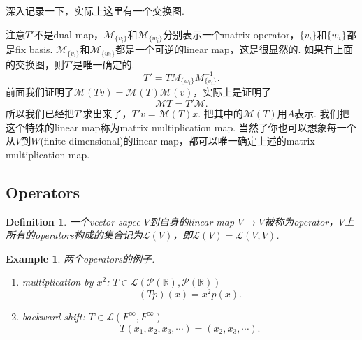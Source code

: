 \documentclass{article}
\newtheorem{example}[theorem]{Example}
\newtheorem{definition}[theorem]{Definition}
\begin{document}
深入记录一下，实际上这里有一个交换图.
\begin{center}
\end{center}
注意$T'$不是dual map，$\mathcal{M}_{\{v_i\}}$和$\mathcal{M}_{\{w_i\}}$分别表示一个matrix operator，$\{v_i\}$和$\{w_i\}$都是fix basis. $\mathcal{M}_{\{v_i\}}$和$\mathcal{M}_{\{w_i\}}$都是一个可逆的linear map，这是很显然的. 如果有上面的交换图，则$T'$是唯一确定的.
$$
T' = TM_{\{w_i\}}M^{-1}_{\{v_i\}}.
$$
前面我们证明了$\mathcal{M}(Tv) = \mathcal{M}(T)\mathcal{M}(v)$，实际上是证明了
$$
\mathcal{M}T = T'\mathcal{M}.
$$
所以我们已经把$T'$求出来了，$T'v= \mathcal{M}(T)x$. 把其中的$\mathcal{M}(T)$用$A$表示. 我们把这个特殊的linear map称为matrix multiplication map. 当然了你也可以想象每一个从$V$到$W$(finite-dimensional)的linear map，都可以唯一确定上述的matrix multiplication map.

\newpage
\subsection{Operators}

\begin{definition}
\rm 一个vector sapce $V$到自身的linear map $V \rightarrow V$被称为operator，$V$上所有的operators构成的集合记为$\mathcal{L}(V)$，即$\mathcal{L}(V)=\mathcal{L}(V,V)$.
\end{definition}

\begin{example}
两个operators的例子.
\begin{enumerate}
	\item multiplication by $x^2$: $T \in \mathcal{L}(\mathcal{P}(\mathbb{R}),\mathcal{P}(\mathbb{R}))$
	$$
		(Tp)(x) = x^2p(x).
	$$
	\item backward shift: $T \in \mathcal{L}(F^{\infty},F^{\infty})$
	$$
		T(x_1,x_2,x_3,\cdots) = (x_2,x_3,\cdots). 
	$$
\end{enumerate}
\end{example}
\end{document}
